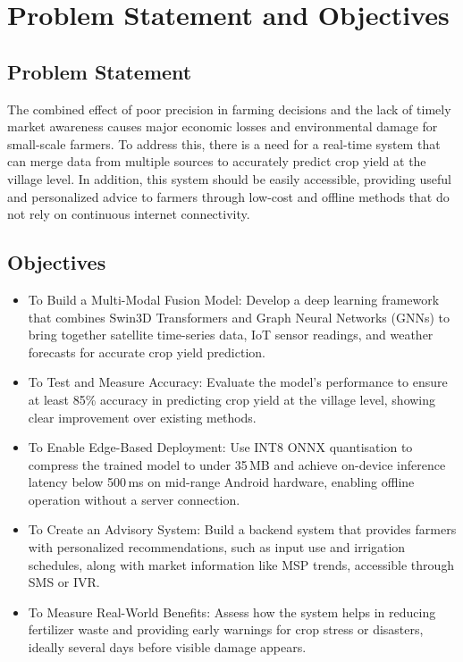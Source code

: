
\section{Problem Statement and Objectives}

\subsection{Problem Statement}
The combined effect of poor precision in farming decisions and the lack of timely market awareness causes major economic losses and environmental damage for small-scale farmers. To address this, there is a need for a real-time system that can merge data from multiple sources to accurately predict crop yield at the village level. In addition, this system should be easily accessible, providing useful and personalized advice to farmers through low-cost and offline methods that do not rely on continuous internet connectivity.

\subsection{Objectives}
\begin{itemize}
    \item To Build a Multi-Modal Fusion Model:
Develop a deep learning framework that combines Swin3D Transformers and Graph Neural Networks (GNNs) to bring together satellite time-series data, IoT sensor readings, and weather forecasts for accurate crop yield prediction.

\item To Test and Measure Accuracy:
Evaluate the model’s performance to ensure at least 85\% accuracy in predicting crop yield at the village level, showing clear improvement over existing methods.

\item To Enable Edge-Based Deployment:
Use INT8 ONNX quantisation to compress the trained model to under 35\,MB and achieve on-device inference latency below 500\,ms on mid-range Android hardware, enabling offline operation without a server connection.

\item To Create an Advisory System:
Build a backend system that provides farmers with personalized recommendations, such as input use and irrigation schedules, along with market information like MSP trends, accessible through SMS or IVR.

\item To Measure Real-World Benefits:
Assess how the system helps in reducing fertilizer waste and providing early warnings for crop stress or disasters, ideally several days before visible damage appears.
\end{itemize}